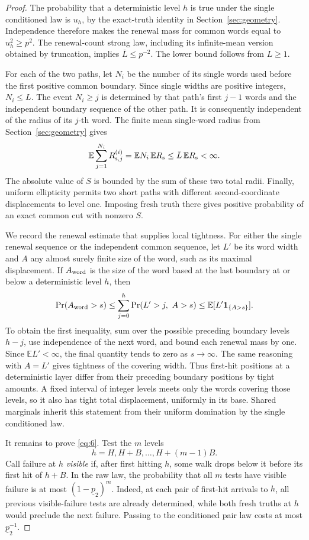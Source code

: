 \begin{proof}
The probability that a deterministic level \(h\) is true under the
single conditioned law is \(u_h\), by the exact-truth identity in
Section~\ref{sec:geometry}. Independence therefore makes the renewal
mass for common words equal to \(u_h^2\ge p^2\). The renewal-count strong
law, including its infinite-mean version obtained by truncation, implies
\(\bar L\le p^{-2}\). The lower bound follows from \(L\ge1\).

For each of the two paths, let \(N_i\) be the number of its single words
used before the first positive common boundary. Since single widths are
positive integers, \(N_i\le L\). The event \(N_i\ge j\) is determined by
that path's first \(j-1\) words and the independent boundary sequence of
the other path. It is consequently independent of the radius of its
\(j\)-th word. The finite mean single-word radius from
Section~\ref{sec:geometry} gives
\[
\mathbb E\sum_{j=1}^{N_i}R_{{\rm s},j}^{(i)}
 =\mathbb E N_i\,\mathbb E R_{\rm s}
 \le \bar L\,\mathbb E R_{\rm s}<\infty.
\]
The absolute value of \(S\) is bounded by the sum of these two total
radii. Finally, uniform ellipticity permits two short paths with
different second-coordinate displacements to level one. Imposing fresh
truth there gives positive probability of an exact common cut with
nonzero \(S\).

We record the renewal estimate that supplies local tightness. For either
the single renewal sequence or the independent common sequence, let
\(L'\) be its word width and \(A\) any almost surely finite size of the
word, such as its maximal displacement. If \(A_{\rm word}\) is the size
of the word based at the last boundary at or below a deterministic
level \(h\), then
\[
\Pr(A_{\rm word}>s)
 \le \sum_{j=0}^h\Pr(L'>j,\ A>s)
 \le \mathbb E[L'\mathbf1_{\{A>s\}}].
\]
To obtain the first inequality, sum over the possible preceding
boundary levels \(h-j\), use independence of the next word, and bound
each renewal mass by one. Since \(\mathbb E L'<\infty\), the final
quantity tends to zero as \(s\to\infty\). The same reasoning with
\(A=L'\) gives tightness of the covering width. Thus first-hit positions
at a deterministic layer differ from their preceding boundary
positions by tight amounts. A fixed interval of integer levels meets
only the words covering those levels, so it also has tight total
displacement, uniformly in its base. Shared marginals inherit this
statement from their uniform domination by the single conditioned law.

It remains to prove \eqref{eq:6}. Test the \(m\) levels
\[
h=H,H+B,\ldots,H+(m-1)B.
\]
Call failure at \(h\) \emph{visible} if, after first hitting \(h\), some
walk drops below it before its first hit of \(h+B\). In the raw law,
the probability that all \(m\) tests have visible failure is at most
\((1-\underline p_2)^m\). Indeed, at each pair of first-hit arrivals to
\(h\), all previous visible-failure tests are already determined, while
both fresh truths at \(h\) would preclude the next failure. Passing to
the conditioned pair law costs at most \(\underline p_2^{-1}\).


\end{proof}
